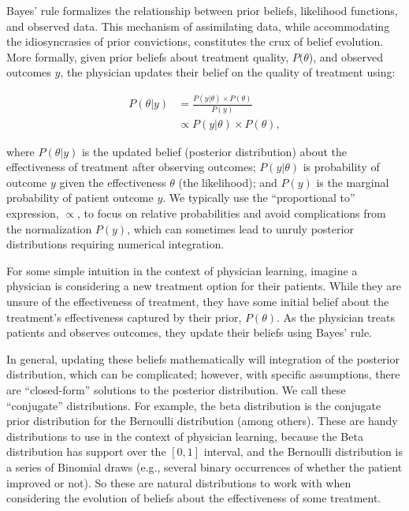 \documentclass[
  letterpaper,
  DIV=11,
  numbers=noendperiod]{scrreport}
\theoremstyle{definition}
\theoremstyle{remark}
\begin{document}
Bayes' rule formalizes the relationship between prior beliefs,
likelihood functions, and observed data. This mechanism of assimilating
data, while accommodating the idiosyncrasies of prior convictions,
constitutes the crux of belief evolution. More formally, given prior
beliefs about treatment quality, \(P(\theta\)), and observed outcomes
\(y\), the physician updates their belief on the quality of treatment
using:

\[\begin{align}
P(\theta|y) &= \frac{P(y|\theta) \times P(\theta)}{P(y)} \\
 & \propto P(y|\theta) \times P(\theta),
\end{align}\]

where \(P(\theta | y)\) is the updated belief (posterior distribution)
about the effectiveness of treatment after observing outcomes;
\(P(y | \theta)\) is probability of outcome \(y\) given the
effectiveness \(\theta\) (the likelihood); and \(P(y)\) is the marginal
probability of patient outcome \(y\). We typically use the
``proportional to'' expression, \(\propto\), to focus on relative
probabilities and avoid complications from the normalization \(P(y)\),
which can sometimes lead to unruly posterior distributions requiring
numerical integration.

For some simple intuition in the context of physician learning, imagine
a physician is considering a new treatment option for their patients.
While they are unsure of the effectiveness of treatment, they have some
initial belief about the treatment's effectiveness captured by their
prior, \(P(\theta)\). As the physician treats patients and observes
outcomes, they update their beliefs using Bayes' rule.

In general, updating these beliefs mathematically will integration of
the posterior distribution, which can be complicated; however, with
specific assumptions, there are ``closed-form'' solutions to the
posterior distribution. We call these ``conjugate'' distributions. For
example, the beta distribution is the conjugate prior distribution for
the Bernoulli distribution (among others). These are handy distributions
to use in the context of physician learning, because the Beta
distribution has support over the \([0,1]\) interval, and the Bernoulli
distribution is a series of Binomial draws (e.g., several binary
occurrences of whether the patient improved or not). So these are
natural distributions to work with when considering the evolution of
beliefs about the effectiveness of some treatment.
\end{document}
